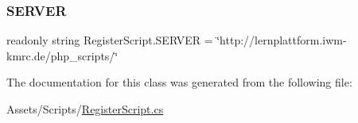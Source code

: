 \subsubsection{\texorpdfstring{S\+E\+R\+V\+ER}{SERVER}}
{\footnotesize\ttfamily readonly string Register\+Script.\+S\+E\+R\+V\+ER = \char`\"{}http\+://lernplattform.\+iwm-\/kmrc.\+de/php\+\_\+scripts/\char`\"{}\hspace{0.3cm}{\ttfamily [static]}}



The documentation for this class was generated from the following file\+:\begin{DoxyCompactItemize}
\item 
Assets/\+Scripts/\hyperlink{RegisterScript_8cs}{Register\+Script.\+cs}\end{DoxyCompactItemize}
